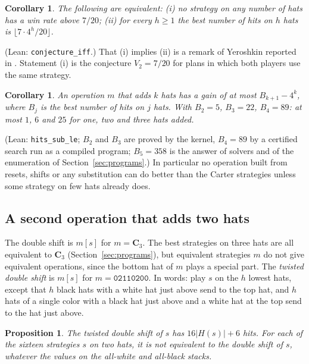 \documentclass[11pt,a4paper]{article}
\newtheorem{proposition}[theorem]{Proposition}
\newtheorem{corollary}[theorem]{Corollary}
\theoremstyle{definition}
\theoremstyle{remark}
\newcommand{\lean}[1]{\texttt{#1}}
\newcommand{\str}[1]{\mathtt{#1}}
\newcommand{\C}{\mathbf{C}}
\begin{document}
\begin{corollary}\label{cor:conj}
The following are equivalent: (i) no strategy on any number of hats has a
win rate above $7/20$; (ii) for every $h \ge 1$ the best number of hits
on $h$ hats is $\lfloor 7\cdot 4^h/20\rfloor$.
\end{corollary}

(Lean: \lean{conjecture\_iff}.) That (i) implies (ii) is a remark of
Yeroshkin reported in \cite{VW20}. Statement (i) is the conjecture
$V_2 = 7/20$ for plans in which both players use the same strategy.

\begin{corollary}\label{cor:gain}
An operation $m$ that adds $k$ hats has a gain of at most $B_{k+1} - 4^k$,
where $B_j$ is the best number of hits on $j$ hats. With $B_2 = 5$,
$B_3 = 22$, $B_4 = 89$: at most $1$, $6$ and $25$ for one, two and three
hats added.
\end{corollary}

(Lean: \lean{hits\_sub\_le}; $B_2$ and $B_3$ are proved by the kernel,
$B_4 = 89$ by a certified search run as a compiled program; $B_5 = 358$
is the answer of solvers and of the enumeration of
Section~\ref{sec:programs}.) In particular no operation built from
resets, shifts or any substitution can do better than the Carter
strategies unless some strategy on few hats already does.

\subsection{A second operation that adds two hats}

The double shift is $m[s]$ for $m = \C_3$. The best strategies on three
hats are all equivalent to $\C_3$ (Section~\ref{sec:programs}), but
equivalent strategies $m$ do not give equivalent operations, since the
bottom hat of $m$ plays a special part. The \emph{twisted double shift}
is $m[s]$ for $m = \str{02110200}$. In words: play $s$ on the $h$ lowest
hats, except that $h$ black hats with a white hat just above send to the
top hat, and $h$ hats of a single color with a black hat just above and
a white hat at the top send to the hat just above.

\begin{proposition}\label{prop:twisted}
The twisted double shift of $s$ has $16|H(s)|+6$ hits. For each of the
sixteen strategies $s$ on two hats, it is not equivalent to the double
shift of $s$, whatever the values on the all-white and all-black stacks.
\end{proposition}
\end{document}
